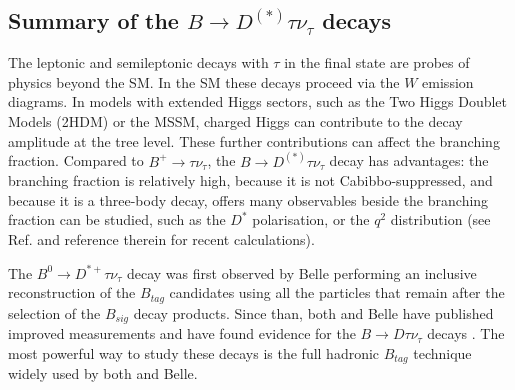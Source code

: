 \subsection{Summary of the $B\to D^{(*)}\tau \nu_\tau$ decays}
\label{slbdecays_b2dtaunu}

The leptonic and semileptonic decays with $\tau$ in the final state 
are probes of physics beyond the SM. In the SM these decays proceed via the $W$ emission
diagrams. In models with extended Higgs sectors, such as the Two Higgs Doublet Models (2HDM)
or the MSSM, charged Higgs can contribute to the decay amplitude at the tree level. These further contributions
can affect the branching fraction. Compared to $B^+\to\tau\nu_\tau$, the $B\to D^{(*)}\tau \nu_\tau$ decay
has advantages: the branching fraction is relatively high, because it is not Cabibbo-suppressed, and because
it is a three-body decay, offers many observables beside the branching fraction can be studied, such as the $D^*$
polarisation, or the $q^2$ distribution (see Ref. \cite{Duraisamy:2014sna} and reference therein for recent 
calculations).

The $B^0\to D^{*+}\tau\nu_\tau$ decay was first observed by Belle \cite{Matyja:2007kt} performing 
an inclusive reconstruction of the $B_{tag}$ candidates using all the particles that remain after the selection
of the $B_{sig}$ decay products. Since than, both \babar and Belle have published improved measurements 
and have found evidence for the $B\to D\tau\nu_\tau$ decays \cite{Aubert:2007dsa,Adachi:2009qg,Bozek:2010xy}. 
The most powerful way to study these decays is the full hadronic $B_{tag}$ technique widely used by both \babar and Belle.

